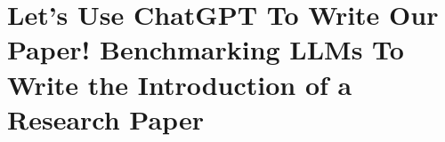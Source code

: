 \section{Let's Use ChatGPT To Write Our Paper! Benchmarking LLMs To Write the Introduction of a Research Paper}

\textcite{garg2025LetsUseChatGPT}